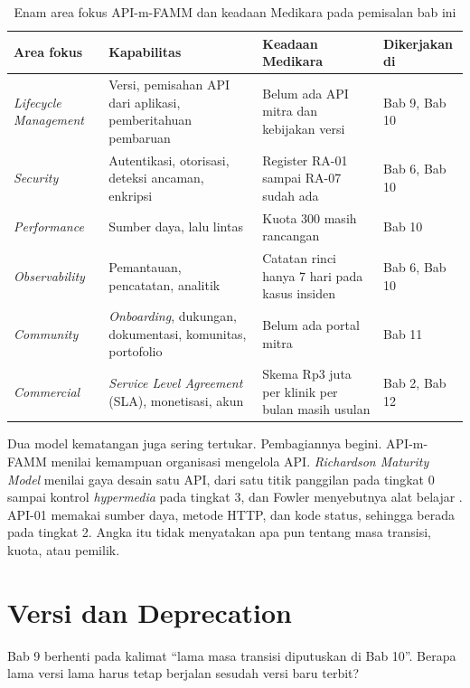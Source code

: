 \begin{table}[!htb]
  \centering
  \caption{Enam area fokus API-m-FAMM dan keadaan Medikara pada pemisalan bab ini}
  \label{tab:ch10-kematangan}
  \footnotesize
  \begin{tabularx}{\textwidth}{H{2.4cm}GGH{1.9cm}}
    \hline
    \textbf{Area fokus} & \textbf{Kapabilitas} & \textbf{Keadaan Medikara} & \textbf{Dikerjakan di} \\ \hline
    \textit{Lifecycle Management} & Versi, pemisahan API dari aplikasi, pemberitahuan pembaruan & Belum ada API mitra dan kebijakan versi & Bab 9, Bab 10 \\ \hline
    \textit{Security} & Autentikasi, otorisasi, deteksi ancaman, enkripsi & Register RA-01 sampai RA-07 sudah ada & Bab 6, Bab 10 \\ \hline
    \textit{Performance} & Sumber daya, lalu lintas & Kuota 300 masih rancangan & Bab 10 \\ \hline
    \textit{Observability} & Pemantauan, pencatatan, analitik & Catatan rinci hanya 7 hari pada kasus insiden & Bab 6, Bab 10 \\ \hline
    \textit{Community} & \textit{Onboarding}, dukungan, dokumentasi, komunitas, portofolio & Belum ada portal mitra & Bab 11 \\ \hline
    \textit{Commercial} & \textit{Service Level Agreement} (SLA), monetisasi, akun & Skema Rp3 juta per klinik per bulan masih usulan & Bab 2, Bab 12 \\ \hline
  \end{tabularx}
\end{table}

Dua model kematangan juga sering tertukar. Pembagiannya begini. API-m-FAMM menilai kemampuan organisasi mengelola API.
\textit{Richardson Maturity Model} menilai gaya desain satu API, dari satu titik panggilan pada tingkat 0 sampai kontrol
\textit{hypermedia} pada tingkat 3, dan Fowler menyebutnya alat belajar \cite{c10-fowler-rmm}. API-01 memakai sumber
daya, metode HTTP, dan kode status, sehingga berada pada tingkat 2. Angka itu tidak menyatakan apa pun tentang masa
transisi, kuota, atau pemilik.

\section{Versi dan Deprecation}

Bab 9 berhenti pada kalimat ``lama masa transisi diputuskan di Bab 10''. Berapa lama versi lama harus tetap berjalan
sesudah versi baru terbit?


